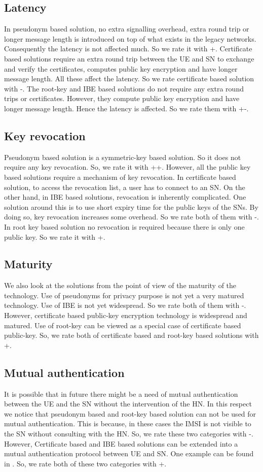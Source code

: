 \documentclass[conference]{IEEEtran}
\begin{document}
\subsection{Latency}
In pseudonym based solution, no extra signalling overhead, extra round trip or longer message length is introduced on top of what exists in the legacy networks. Consequently the latency is not affected much. So we rate it with +. Certificate based solutions require an extra round trip between the UE and SN to exchange and verify the certificates, computes public key encryption and have longer message length. All these affect the latency. So we rate certificate based solution with -. The root-key and IBE based solutions do not require any extra round trips or certificates. However, they compute public key encryption and have longer message length. Hence the latency is affected. So we rate them with +-.


\subsection{Key revocation}
Pseudonym based solution is a symmetric-key based solution. So it does not require any key revocation. So, we rate it with ++. However, all the public key based solutions require a mechanism of key revocation. In certificate based solution, to access the revocation list, a user has to connect to an SN. On the other hand, in IBE based solutions, revocation is inherently complicated. One solution around this is to use short expiry time for the public keys of the SNs. By doing so, key revocation increases some overhead. So we rate both of them with -. In root key based solution no revocation is required because there is only one public key. So we rate it with +.

\subsection{Maturity}
We also look at the solutions from the point of view of the maturity of the technology. Use of pseudonyms for privacy purpose is not yet a very matured technology. Use of IBE is not yet widespread. So we rate both of them with -. However, certificate based public-key encryption technology is widespread and matured. Use of root-key can be viewed as a special case of certificate based public-key. So, we rate both of certificate based and root-key based solutions with +.

\subsection{Mutual authentication} It is possible that in future there might be a need of mutual authentication between the UE and the SN without the intervention of the HN. In this respect we notice that pseudonym based and root-key based solution can not be used for mutual authentication. This is because, in these cases the IMSI is not visible to the SN without consulting with the HN. So, we rate these two categories with -. However, Certificate based and IBE based solutions can be extended into a mutual authentication protocol between UE and SN. One example can be found in \cite{ICTJournal}. So, we rate both of these two categories with +.
   
\end{document}
